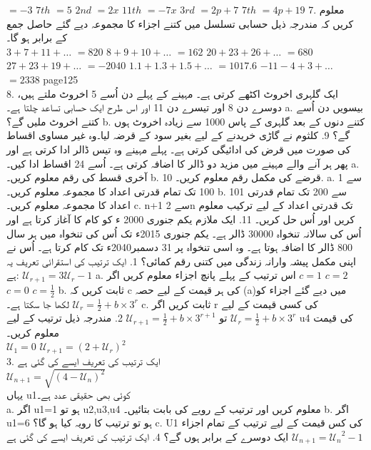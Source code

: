 \(=-3\)
\(7th\)
\(=5\)
\(2nd\)
\(=2x\)
\(11th\)
\(=-7x\)
\(3rd\)
\(=2p+7\)
\(7th\)
\(=4p+19\)
7.	معلوم کریں کہ مندرجہ ذیل حسابی تسلسل میں کتنے اجزاء کا مجموعہ دیے گئے حاصل جمع کے برابر ہو گا۔\\
\(3+7+11+\dotsc\)
\(=820\)
\(8+9+10+\dotsc\)
\(=162\)
\(20+23+26+\dotsc\)
\(=680\)
\(27+23+19+\dotsc\)
\(=-2040\)
\(1.1+1.3+1.5+\dotsc\)
\(=1017.6\)
\(-11-4+3+\dotsc\)
\(=2338\)
\clearpage
page125\\
8.	ایک گلہری اخروٹ اکٹھے کرتی ہے۔ مہینے کے پہلے دن اُسے 5 اخروٹ ملتے ہیں، دوسرے دن 8 اور تیسرے دن 11 اور اس طرح ایک حسابی تساعد چلتا ہے۔
a.	بیسویں دن اُسے کتنے اخروٹ ملیں گے؟
b.	کتنے دنوں کے بعد گلہری کے پاس 1000 سے زیادہ اخروٹ ہوں گے؟
9.	کلثوم نے گاڑی خریدنے کے لیے بغیر سود کے قرضہ لیا۔وہ غیر مساوی اقساط کی صورت میں قرض کی ادائیگی کرتی ہے۔ پہلے مہینے وہ تیس ڈالر ادا کرتی ہے اور پھر ہر آنے والے مہینے میں مزید دو ڈالر کا اضافہ کرتی ہے۔ اُسے 24 اقساط ادا کیں۔
a.	آخری قسط کی رقم معلوم کریں۔
b.	قرضے کی مکمل رقم معلوم کریں۔
10.	
a.	1 سے 100 تک تمام قدرتی اعداد کا مجموعہ معلوم کریں۔
b.	101 سے 200 تک تمام قدرتی اعداد کا مجموعہ معلوم کریں۔
c.	n+1 سے 2n تک قدرتی اعداد کے لیے ترکیب معلوم کریں اور اُس حل کریں۔
11.	ایک ملازم یکم جنوری 2000 ء کو کام کا آغاز کرتا ہے اور اُس کی سالانہ تنخواہ 30000 ڈالر ہے۔ یکم جنوری 2015ء تک اُس کی تنخواہ میں ہر سال 800 ڈالر کا اضافہ ہوتا ہے۔ وہ اسی تنخواہ پر 31 دسمبر2040ء تک کام کرتا ہے۔ اُس نے اپنی مکمل پیشہ وارانہ زندگی میں کتنی رقم کمائی؟
1.	ایک ترتیب کی استقرائی تعریف یہ ہے:
\(\mathcal {U}_{r+1}=3\mathcal{U}_r-1\)
a.
اس ترتیب کے پہلے پانچ اجزاء معلوم کریں اگر
\(c=1\)
\(c=2\)
\(c=0\)
\(c=\frac{1}{2}\)
b.
ثابت کریں کہ c کی ہر قیمت کے لیے حصہ (a)میں دیے گئے اجزاء کو
\(\mathcal{U}_r=\frac{1}{2}+b\times3^r\)
  لکھا جا سکتا ہے۔
c.
ثابت کریں اگر r کی کسی قیمت کے لیے
\(\mathcal{U}_r=\frac{1}{2}+b\times3^r\)
تو
\(\mathcal{U}_{r+1}=\frac{1}{2}+b\times3^{r+1}\)
2.	مندرجہ ذیل ترتیب کے لیے u4 کی قیمت معلوم کریں۔\\
\(\mathcal{U}_1=0\)
\(\mathcal{U}_{r+1}=(2+\mathcal{U}_r)^2\)\\
3.	ایک ترتیب کی تعریف ایسے کی گئی ہے\\
\(\mathcal{U}_{n+1}=\sqrt{({4}-{\mathcal{U}_n})^2}\)\\
یہاں  u1کوئی بھی حقیقی عدد ہے۔\\
a.	اگر u1=1 ہو تو u2,u3,u4 معلوم کریں اور ترتیب کے رویے کی بابت بتائیں۔
b.	اگر u1=6 ہو تو ترتیب کا رویہ کیا ہو گا؟
c.	U1 کی کس قیمت کے لیے ترتیب کے تمام اجزاء ایک دوسرے کے برابر ہوں گے؟
4.	ایک ترتیب کی تعریف ایسے کی گئی ہے
\(\mathcal{U}_{n+1}={\mathcal{U}_n}^2 -1\)\\
